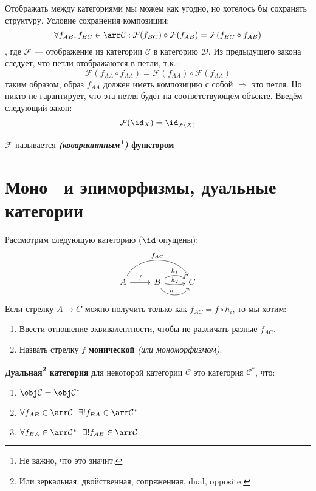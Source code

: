 Отображать между категориями мы можем как угодно, но хотелось бы сохранять структуру. Условие сохранения композиции:
\[\forall f_{AB}, f_{BC} \in \arr \mathcal{C} : \mathcal{F}(f_{BC}) \circ \mathcal{F}(f_{AB}) = \mathcal{F}(f_{BC} \circ f_{AB})\]
, где \(\mathcal{F}\) --- отображение из категории \(\mathcal{C}\) в категорию \(\mathcal{D}\). Из предыдущего закона следует, что петли отображаются в петли, т.к.:
\[\mathcal{F}(f_{AA} \circ f_{AA}) = \mathcal{F}(f_{AA}) \circ \mathcal{F}(f_{AA})\]
таким образом, образ \(f_{AA}\) должен иметь композицию с собой \( \Rightarrow \) это петля. Но никто не гарантирует, что эта петля будет на соответствующем объекте. Введём следующий закон:
\[\mathcal{F}(\id_X) = \id_{\mathcal{F}(X)}\]

\begin{definition}
    \(\mathcal{F}\) называется \textbf{\textit{(ковариантным\footnote{Не важно, что это значит.})} функтором}
\end{definition}

\section{Моно-- и эпиморфизмы, дуальные категории}

Рассмотрим следующую категорию (\(\id\) опущены):
\[\begin{tikzcd}
        A \arrow{r}{f} \arrow[bend left = 60]{rr}{f_{AC}} & B \arrow[bend left]{r}{h_1} \arrow[bend right = 10]{r}{h_2} \arrow[bend right = 60]{r}{h_{\dots}} & C
    \end{tikzcd}\]
Если стрелку \(A \to C\) можно получить только как \(f_{AC} = f \circ h_i\), то мы хотим:
\begin{enumerate}
    \item Ввести отношение эквивалентности, чтобы не различать разные \(f_{AC}\).
    \item Назвать стрелку \(f\) \textbf{монической} \textit{(или мономорфизмом)}.
\end{enumerate}

\begin{definition}
    \textbf{Дуальная\footnote{Или зеркальная, двойственная, сопряженная, dual, opposite.} категория} для некоторой категории \(\mathcal{C}\) это категория \(\mathcal{C}^*\), что:
    \begin{enumerate}
        \item \(\obj \mathcal{C} = \obj \mathcal{C}^*\)
        \item \(\forall f_{AB} \in \arr \mathcal{C} \ \ \exists ! f_{BA} \in \arr \mathcal{C}^*\)
        \item \(\forall f_{BA} \in \arr \mathcal{C}^* \ \ \exists ! f_{AB} \in \arr \mathcal{C}\)
    \end{enumerate}
\end{definition}

